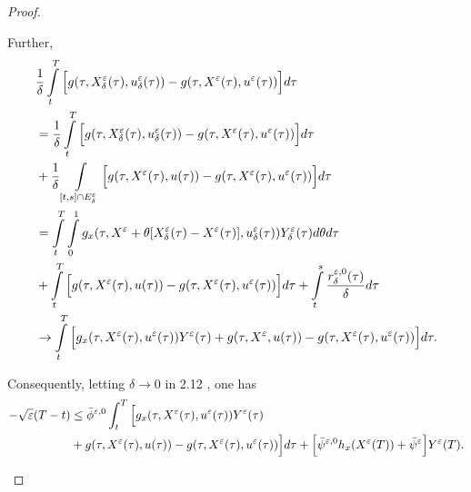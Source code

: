 \begin{proof}
\begin{asparaenum}
        Further,
        \begin{align*}
            &\dfrac{1}{\delta} \int\limits_{t}^{T}\Big[%
                g(\tau, X_{\delta}^{\veps}(\tau), u_{\delta}^{\veps}(\tau))%
                - g(\tau, X^{\veps}(\tau),u^{\veps}(\tau))\Big] d\tau \\
            &= \dfrac{1}{\delta} \int\limits_{t}^{T}\Big[%
                g(\tau, X_{\delta}^{\veps}(\tau), u_{\delta}^{\veps}(\tau))%
                - g(\tau, X^{\veps}(\tau),u^{\veps}(\tau))\Big] d\tau \\
            &+ \dfrac{1}{\delta} \int\limits_{[t,s]\cap E_{\delta}^{\veps}}\Big[%
                g(\tau, X^{\veps}(\tau), u(\tau))%
                - g(\tau, X^{\veps}(\tau),u^{\veps}(\tau))\Big] d\tau \\
            &= \int\limits_{t}^{T} \int\limits_{0}^{1} %
                g_x(\tau, X^{\veps} + \theta[X_{\delta}^{\veps}(\tau)-%
                X^{\veps}(\tau)], u_{\delta}^{\veps}(\tau))Y_{\delta}^{\veps}(\tau)%
                d\theta d\tau \\
            &+ \int\limits_{t}^{T}\Big[g(\tau, X^{\veps}(\tau), u(\tau))%
                - g(\tau, X^{\veps}(\tau),u^{\veps}(\tau))\Big]d\tau %
                + \int\limits_{t}^{s}\dfrac{r_{\delta}^{\veps,0}(\tau)}{\delta} d\tau \\
            &\to \int\limits_{t}^{T}\Big[g_{x}(\tau, X^{\veps}(\tau), u^{\veps}(\tau))%
                Y^{\veps}(\tau) + g(\tau, X^{\veps}, u(\tau)) - g(\tau, X^{\veps}(\tau), %
                u^{\veps}(\tau))\Big] d\tau.
        \end{align*}
        \item
            Consequently, letting $\delta \to 0$ in 2.12 , one has
            \begin{align*}
                -\sqrt{\veps}(T-t) 
                &
                \leq \Bar{\phi} ^ {\veps,0}
                \int_{t} ^ {T}
                \Big[%
                    g_{x}(\tau, X^{\veps}(\tau), u^{\veps}(\tau))
                    Y^{\veps}(\tau) 
                    \\
                    &+ %
                    g(\tau, X ^ {\veps} (\tau), u(\tau))
                    - 
                    g(\tau, X^{\veps}(\tau), u^{\veps}(\tau))
                \Big]
                d \tau 
                + \Big[
                    \Bar{\psi} ^ {\veps, 0} h_x (X^{\veps}(T)) %
                    + \Bar{\psi}^{\veps}
                \Big]
                Y ^ {\veps}(T).
            \end{align*}

\end{asparaenum}
\end{proof}
